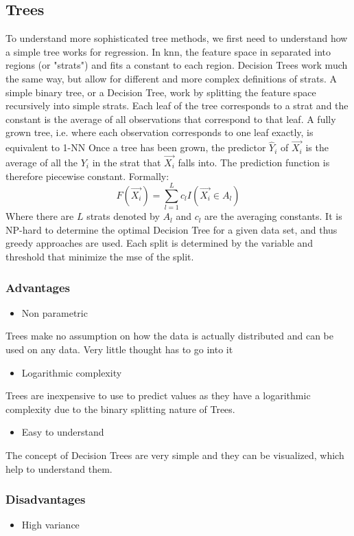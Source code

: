 \subsection{Trees}
To understand more sophisticated tree methods, we first need to understand how a simple tree works for regression. In \acrshort{knn}, the feature space in separated into regions (or "strats") and fits a constant to each region. Decision Trees work much the same way, but allow for  different and more complex definitions of strats.
A simple binary tree, or a Decision Tree, work by splitting the feature space recursively into simple strats. Each leaf of the tree corresponds to a strat and the constant is the average of all observations that correspond to that leaf. A fully grown tree, i.e. where each observation corresponds to one leaf exactly, is equivalent to 1-NN
 Once a tree has been grown, the predictor $\hat{Y}_i$ of $\vec{X_i}$ is the average of all the $Y_i$ in the strat that $\vec{X_i}$ falls into. The prediction function is therefore piecewise constant.
Formally:
$$
F(\vec{X_i}) = \sum_{l=1}^L c_l I(\vec{X_i} \in A_l)
$$
Where there are $L$ strats denoted by $A_l$ and $c_l$ are the averaging constants.
It is NP-hard to determine the optimal Decision Tree for a given data set, and thus greedy approaches are used. Each split is determined by the variable and threshold that minimize the \acrlong{mse} of the split.

\subsubsection{Advantages}
\begin{itemize}
\item Non parametric
\end{itemize}
Trees make no assumption on how the data is actually distributed and can be used on any data. Very little thought has to go into it
\begin{itemize}
\item Logarithmic complexity
\end{itemize}
Trees are inexpensive to use to predict values as they have a logarithmic complexity due to the binary splitting nature of Trees.
\begin{itemize}
\item Easy to understand
\end{itemize}
The concept of Decision Trees are very simple and they can be visualized, which help to understand them.
\subsubsection{Disadvantages}
\begin{itemize}
\item High variance
\end{itemize}

